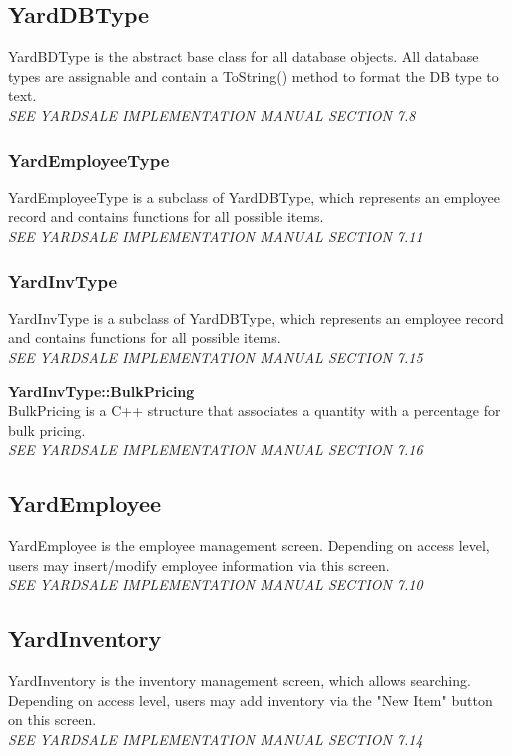 \documentclass{report}
\begin{document}
\begin{itemize}
        \subsection{YardDBType}
        YardBDType is the abstract base class for all database
        objects.  All database types are assignable and contain a
        ToString() method to format the DB type to text.\\
        {\sl SEE YARDSALE IMPLEMENTATION MANUAL SECTION 7.8}

            \subsubsection{YardEmployeeType}
            YardEmployeeType is a subclass of YardDBType, which
            represents an employee record and contains functions for
            all possible items.\\
            {\sl SEE YARDSALE IMPLEMENTATION MANUAL SECTION 7.11}

            \subsubsection{YardInvType}
            YardInvType is a subclass of YardDBType, which
            represents an employee record and contains functions for
            all possible items.\\
            {\sl SEE YARDSALE IMPLEMENTATION MANUAL SECTION 7.15}
            \begin{list}{}
                \item {\bf YardInvType::BulkPricing}\\BulkPricing is a
                C++ structure that associates a quantity with a
                percentage for bulk pricing.\\
                {\sl SEE YARDSALE IMPLEMENTATION MANUAL SECTION 7.16}
            \end{list}

        \subsection{YardEmployee}
        YardEmployee is the employee management screen.  Depending on
        access level, users may insert/modify employee information via
        this screen.\\
        {\sl SEE YARDSALE IMPLEMENTATION MANUAL SECTION 7.10}

        \subsection{YardInventory}
        YardInventory is the inventory management screen, which allows
        searching.  Depending on access level, users may add inventory
        via the "New Item" button on this screen.\\
        {\sl SEE YARDSALE IMPLEMENTATION MANUAL SECTION 7.14}


\end{itemize}
\end{document}

